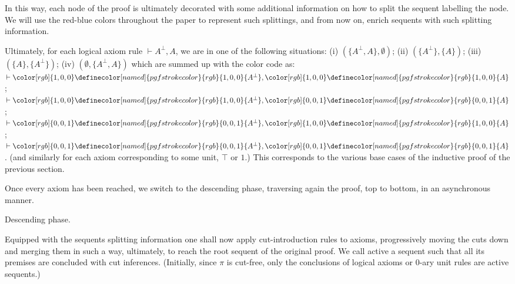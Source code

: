 \documentclass[10pt,a4paper]{article}
\begin{document}
 
 
In this way, each node of the proof is ultimately decorated with some additional information on how to split the sequent labelling the node. We will use the red-blue colors throughout the paper to represent such splittings, and from now on, enrich sequents with such splitting information.\par
 
 
 
Ultimately, for each logical axiom rule $\vdash A^{\perp},A$, we are in one of the following situations: (i) $(\{A^{\perp},A\},\emptyset)$; (ii) $(\{A^{\perp}\},\{A\})$; (iii) $(\{A\},\{A^{\perp}\})$; (iv) $(\emptyset,\{A^{\perp},A\})$ which are summed up with the color code as: $\vdash{\color[rgb]{1,0,0}\definecolor[named]{pgfstrokecolor}{rgb}{1,0,0}{{A^{\perp}}}},{\color[rgb]{1,0,0}\definecolor[named]{pgfstrokecolor}{rgb}{1,0,0}{{A}}}$; $\vdash{\color[rgb]{1,0,0}\definecolor[named]{pgfstrokecolor}{rgb}{1,0,0}{{A^{\perp}}}},{\color[rgb]{0,0,1}\definecolor[named]{pgfstrokecolor}{rgb}{0,0,1}{{A}}}$; $\vdash{\color[rgb]{0,0,1}\definecolor[named]{pgfstrokecolor}{rgb}{0,0,1}{{A^{\perp}}}},{\color[rgb]{1,0,0}\definecolor[named]{pgfstrokecolor}{rgb}{1,0,0}{{A}}}$; $\vdash{\color[rgb]{0,0,1}\definecolor[named]{pgfstrokecolor}{rgb}{0,0,1}{{A^{\perp}}}},{\color[rgb]{0,0,1}\definecolor[named]{pgfstrokecolor}{rgb}{0,0,1}{{A}}}$. (and similarly for each axiom corresponding to some unit, $\top$ or $1$.) This corresponds to the various base cases of the inductive proof of the previous section.\par
 
 
 
Once every axiom has been reached, we switch to the descending phase, traversing again the proof, top to bottom, in an asynchronous manner.\par
 
  Descending phase.  
 
Equipped with the sequents splitting information one shall now apply cut-introduction rules to axioms, progressively moving the cuts down and merging them in such a way, ultimately, to reach the root sequent of the original proof. We call active a sequent such that all its premises are concluded with cut inferences. (Initially, since $\pi$ is cut-free, only the conclusions of logical axioms or 0-ary unit rules are active sequents.)\par
 
\end{document}
